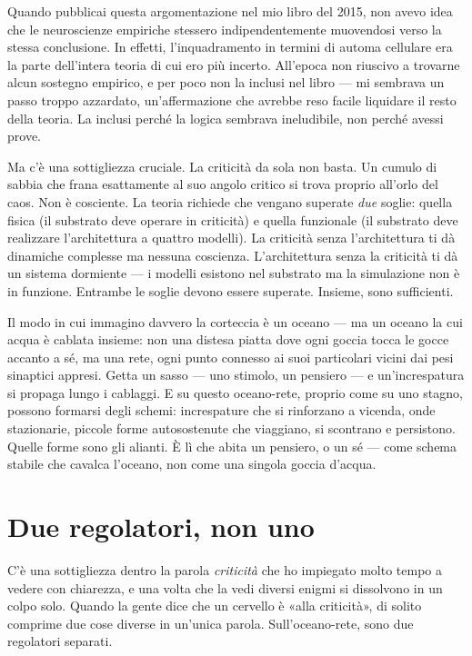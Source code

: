 \documentclass[11pt, twoside, openright]{book}
\begin{document}
Quando pubblicai questa argomentazione nel mio libro del 2015, non avevo idea che le neuroscienze empiriche stessero indipendentemente muovendosi verso la stessa conclusione. In effetti, l'inquadramento in termini di automa cellulare era la parte dell'intera teoria di cui ero più incerto. All'epoca non riuscivo a trovarne alcun sostegno empirico, e per poco non la inclusi nel libro --- mi sembrava un passo troppo azzardato, un'affermazione che avrebbe reso facile liquidare il resto della teoria. La inclusi perché la logica sembrava ineludibile, non perché avessi prove.

Ma c'è una sottigliezza cruciale. La criticità da sola non basta. Un cumulo di sabbia che frana esattamente al suo angolo critico si trova proprio all'orlo del caos. Non è cosciente. La teoria richiede che vengano superate \textit{due} soglie: quella fisica (il substrato deve operare in criticità) e quella funzionale (il substrato deve realizzare l'architettura a quattro modelli). La criticità senza l'architettura ti dà dinamiche complesse ma nessuna coscienza. L'architettura senza la criticità ti dà un sistema dormiente --- i modelli esistono nel substrato ma la simulazione non è in funzione. Entrambe le soglie devono essere superate. Insieme, sono sufficienti.

Il modo in cui immagino davvero la corteccia è un oceano --- ma un oceano la cui acqua è cablata insieme: non una distesa piatta dove ogni goccia tocca le gocce accanto a sé, ma una rete, ogni punto connesso ai suoi particolari vicini dai pesi sinaptici appresi. Getta un sasso --- uno stimolo, un pensiero --- e un'increspatura si propaga lungo i cablaggi. E su questo oceano-rete, proprio come su uno stagno, possono formarsi degli schemi: increspature che si rinforzano a vicenda, onde stazionarie, piccole forme autosostenute che viaggiano, si scontrano e persistono. Quelle forme sono gli alianti. È lì che abita un pensiero, o un sé --- come schema stabile che cavalca l'oceano, non come una singola goccia d'acqua.

\section*{Due regolatori, non uno}

C'è una sottigliezza dentro la parola \textit{criticità} che ho impiegato molto tempo a vedere con chiarezza, e una volta che la vedi diversi enigmi si dissolvono in un colpo solo. Quando la gente dice che un cervello è «alla criticità», di solito comprime due cose diverse in un'unica parola. Sull'oceano-rete, sono due regolatori separati.
\end{document}
